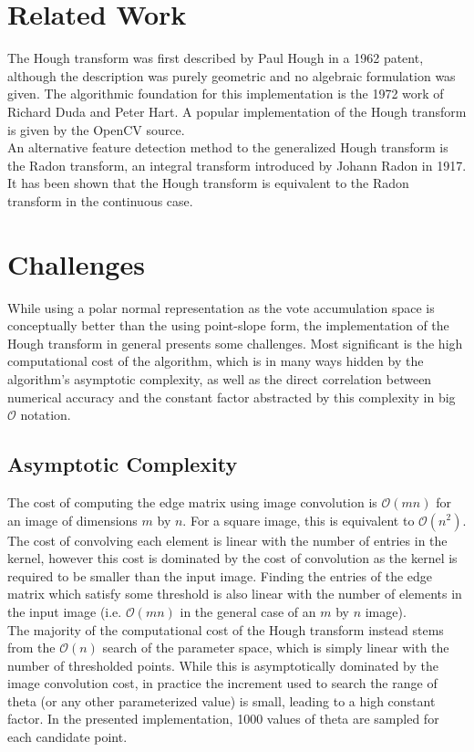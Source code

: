 \documentclass[letterpaper,12pt,titlepage]{article}
\begin{document}
\section{Related Work}
The Hough transform was first described by Paul Hough in a 1962 patent\cite{paulhough1962},
although the description was purely geometric and no algebraic formulation was given.
The algorithmic foundation for this implementation is the 1972 work of Richard Duda
and Peter Hart\cite{dudahart1972}. A popular implementation of the Hough transform is
given by the OpenCV source.
\\
An alternative feature detection method to the generalized Hough transform is the Radon transform,
an integral transform introduced by Johann Radon in 1917. It has been shown that the Hough transform
is equivalent to the Radon transform in the continuous case\cite{radonhough}.

\section{Challenges}
While using a polar normal representation as the vote accumulation space is
conceptually better than the using point-slope form, the implementation of
the Hough transform in general presents some challenges. Most significant is
the high computational cost of the algorithm, which is in many ways hidden by
the algorithm's asymptotic complexity, as well as the direct correlation between
numerical accuracy and the constant factor abstracted by this complexity in
big $\mathcal{O}$ notation.

\subsection{Asymptotic Complexity}
The cost of computing the edge matrix using image convolution is $\mathcal{O}(mn)$ for
an image of dimensions $m$ by $n$. For a square image, this is equivalent to $\mathcal{O}(n^{2})$.
The cost of convolving each element is linear with the number of entries in the kernel, however
this cost is dominated by the cost of convolution as the kernel is required to be smaller than
the input image. Finding the entries of the edge matrix which satisfy some threshold is also linear with
the number of elements in the input image (i.e. $\mathcal{O}(mn)$ in the general case of an $m$
by $n$ image).
\\
The majority of the computational cost of the Hough transform instead stems from the
$\mathcal{O}(n)$ search of the parameter space, which is simply linear with the number of
thresholded points. While this is asymptotically dominated by the image convolution cost,
in practice the increment used to search the range of theta (or any other parameterized value)
is small, leading to a high constant factor. In the presented implementation, 1000 values of
theta are sampled for each candidate point.
\end{document}
